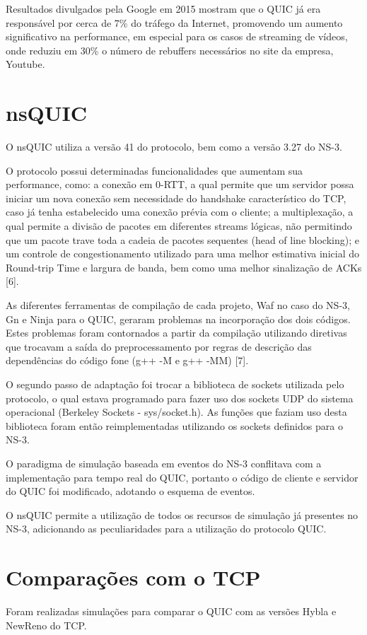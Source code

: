 \documentclass{article}
\begin{document}
Resultados divulgados pela Google em 2015 mostram que o QUIC já era responsável por cerca de 7\% do tráfego da Internet,
promovendo um aumento significativo na performance, em especial para os casos de streaming de vídeos, onde reduziu em
30\% o número de rebuffers necessários no site da empresa, Youtube.

\section{nsQUIC}
O nsQUIC utiliza a versão 41 do protocolo, bem como a versão 3.27 do NS-3.

O protocolo possui determinadas funcionalidades que aumentam sua performance, como: a conexão em 0-RTT, a qual permite
que um servidor possa iniciar um nova conexão sem necessidade do handshake característico do TCP, caso já tenha
estabelecido uma conexão prévia com o cliente; a multiplexação, a qual permite a divisão de pacotes em diferentes
streams lógicas, não permitindo que um pacote trave toda a cadeia de pacotes sequentes (head of line blocking); e um
controle de congestionamento utilizado para uma melhor estimativa inicial do Round-trip Time e largura de banda, bem
como uma melhor sinalização de ACKs [6].


As diferentes ferramentas de compilação de cada projeto, Waf no caso do NS-3, Gn e Ninja para o QUIC, geraram problemas
na incorporação dos dois códigos. Estes problemas foram contornados a partir da compilação utilizando diretivas que
trocavam a saída do preprocessamento por regras de descrição das dependências do código fone (g++ -M e g++ -MM) [7].

O segundo passo de adaptação foi trocar a biblioteca de sockets utilizada pelo protocolo, o qual estava programado para
fazer uso dos sockets UDP do sistema operacional (Berkeley Sockets - sys/socket.h). As funções que faziam uso desta
biblioteca foram então reimplementadas utilizando os sockets definidos para o NS-3.

O paradigma de simulação baseada em eventos do NS-3 conflitava com a implementação para tempo real do QUIC, portanto o
código de cliente e servidor do QUIC foi modificado, adotando o esquema de eventos.


O nsQUIC permite a utilização de todos os recursos de simulação já presentes no NS-3, adicionando as peculiaridades para
a utilização do protocolo QUIC.

\section{Comparações com o TCP}
Foram realizadas simulações para comparar o QUIC com as versões Hybla e NewReno do TCP.
\end{document}
